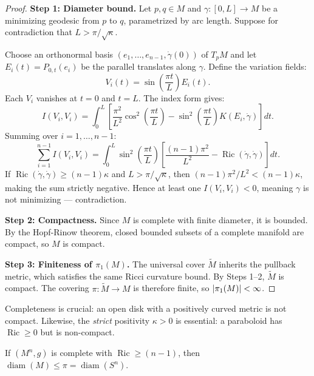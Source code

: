 \begin{proof}
\textbf{Step 1: Diameter bound.}
Let $p, q \in M$ and $\gamma : [0, L] \to M$ be a minimizing geodesic from $p$ to
$q$, parametrized by arc length. Suppose for contradiction that
$L > \pi / \sqrt{\kappa}$.

Choose an orthonormal basis $(e_1, \ldots, e_{n-1}, \dot{\gamma}(0))$ of $T_pM$
and let $E_i(t) = P_{0,t}(e_i)$ be the parallel translates along $\gamma$.
Define the variation fields:
\[
    V_i(t) = \sin\!\left(\frac{\pi t}{L}\right) E_i(t).
\]
Each $V_i$ vanishes at $t = 0$ and $t = L$. The index form gives:
\[
    I(V_i, V_i) = \int_0^L \left[ \frac{\pi^2}{L^2} \cos^2\!\left(\frac{\pi t}{L}\right)
    - \sin^2\!\left(\frac{\pi t}{L}\right) K(E_i, \dot{\gamma}) \right] dt.
\]
Summing over $i = 1, \ldots, n-1$:
\[
    \sum_{i=1}^{n-1} I(V_i, V_i) = \int_0^L \sin^2\!\left(\frac{\pi t}{L}\right)
    \left[ \frac{(n-1)\pi^2}{L^2} - \operatorname{Ric}(\dot{\gamma}, \dot{\gamma}) \right] dt.
\]
If $\operatorname{Ric}(\dot{\gamma}, \dot{\gamma}) \geq (n-1)\kappa$ and
$L > \pi/\sqrt{\kappa}$, then $(n-1)\pi^2/L^2 < (n-1)\kappa$, making the sum
strictly negative. Hence at least one $I(V_i, V_i) < 0$, meaning $\gamma$ is not
minimizing --- contradiction.

\textbf{Step 2: Compactness.}
Since $M$ is complete with finite diameter, it is bounded. By the Hopf-Rinow theorem,
closed bounded subsets of a complete manifold are compact, so $M$ is compact.

\textbf{Step 3: Finiteness of $\pi_1(M)$.}
The universal cover $\widetilde{M}$ inherits the pullback metric, which satisfies
the same Ricci curvature bound. By Steps 1--2, $\widetilde{M}$ is compact.
The covering $\pi : \widetilde{M} \to M$ is therefore finite, so
$\left| \pi_1(M) \right| < \infty$.
\end{proof}

\begin{warning}[title=\textbf{Completeness is essential}]
Completeness is crucial: an open disk with a positively curved metric is not
compact. Likewise, the \emph{strict} positivity $\kappa > 0$ is essential:
a paraboloid has $\operatorname{Ric} \geq 0$ but is non-compact.
\end{warning}

\begin{corollary}
If $(M^n, g)$ is complete with $\operatorname{Ric} \geq (n-1)$, then
$\operatorname{diam}(M) \leq \pi = \operatorname{diam}(S^n)$.
\end{corollary}

